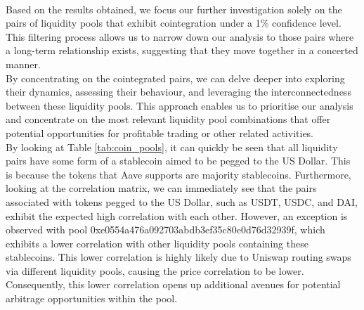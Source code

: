 \\[3mm]
\noindent Based on the results obtained, we focus our further investigation solely on the pairs of liquidity pools that exhibit cointegration under a 1\% confidence level. This filtering process allows us to narrow down our analysis to those pairs where a long-term relationship exists, suggesting that they move together in a concerted manner.
\\[3mm]
By concentrating on the cointegrated pairs, we can delve deeper into exploring their dynamics, assessing their behaviour, and leveraging the interconnectedness between these liquidity pools. This approach enables us to prioritise our analysis and concentrate on the most relevant liquidity pool combinations that offer potential opportunities for profitable trading or other related activities.
\\[3mm]
By looking at Table \ref{tab:coin_pools}, it can quickly be seen that all liquidity pairs have some form of a stablecoin aimed to be pegged to the US Dollar. This is because the tokens that Aave supports are majority stablecoins. Furthermore, looking at the correlation matrix, we can immediately see that the pairs associated with tokens pegged to the US Dollar, such as USDT, USDC, and DAI, exhibit the expected high correlation with each other. However, an exception is observed with pool 0xe0554a476a092703abdb3ef35c80e0d76d32939f, which exhibits a lower correlation with other liquidity pools containing these stablecoins. This lower correlation is highly likely due to Uniswap routing swaps via different liquidity pools, causing the price correlation to be lower. Consequently, this lower correlation opens up additional avenues for potential arbitrage opportunities within the pool.
